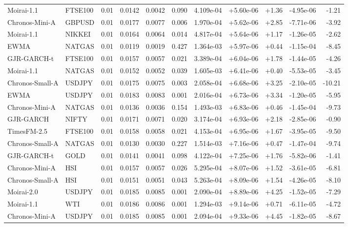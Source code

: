 \begin{tabular}{llrrrrrrrrr}
Moirai-1.1 & FTSE100 & 0.01 & 0.0142 & 0.0042 & 0.090 & 4.109e-04 & +5.60e-06 & +1.36 & -4.95e-06 & -1.21 \\
Chronos-Mini-A & GBPUSD & 0.01 & 0.0177 & 0.0077 & 0.006 & 1.970e-04 & +5.62e-06 & +2.85 & -7.71e-06 & -3.92 \\
Moirai-1.1 & NIKKEI & 0.01 & 0.0164 & 0.0064 & 0.014 & 4.817e-04 & +5.64e-06 & +1.17 & -1.26e-05 & -2.62 \\
EWMA & NATGAS & 0.01 & 0.0119 & 0.0019 & 0.427 & 1.364e-03 & +5.97e-06 & +0.44 & -1.15e-04 & -8.45 \\
GJR-GARCH-t & FTSE100 & 0.01 & 0.0157 & 0.0057 & 0.021 & 3.389e-04 & +6.04e-06 & +1.78 & -1.44e-05 & -4.26 \\
Moirai-1.1 & NATGAS & 0.01 & 0.0152 & 0.0052 & 0.039 & 1.605e-03 & +6.41e-06 & +0.40 & -5.53e-05 & -3.45 \\
Chronos-Small-A & USDJPY & 0.01 & 0.0175 & 0.0075 & 0.003 & 2.058e-04 & +6.68e-06 & +3.25 & -2.10e-05 & -10.21 \\
EWMA & USDJPY & 0.01 & 0.0183 & 0.0083 & 0.001 & 2.016e-04 & +6.73e-06 & +3.34 & -1.20e-05 & -5.95 \\
Chronos-Mini-A & NATGAS & 0.01 & 0.0136 & 0.0036 & 0.154 & 1.493e-03 & +6.83e-06 & +0.46 & -1.45e-04 & -9.73 \\
GJR-GARCH & NIFTY & 0.01 & 0.0171 & 0.0071 & 0.020 & 3.174e-04 & +6.93e-06 & +2.18 & -2.85e-06 & -0.90 \\
TimesFM-2.5 & FTSE100 & 0.01 & 0.0158 & 0.0058 & 0.021 & 4.153e-04 & +6.95e-06 & +1.67 & -3.95e-05 & -9.50 \\
Chronos-Small-A & NATGAS & 0.01 & 0.0130 & 0.0030 & 0.227 & 1.514e-03 & +7.16e-06 & +0.47 & -1.47e-04 & -9.74 \\
GJR-GARCH-t & GOLD & 0.01 & 0.0141 & 0.0041 & 0.098 & 4.122e-04 & +7.25e-06 & +1.76 & -5.82e-06 & -1.41 \\
Chronos-Mini-A & HSI & 0.01 & 0.0157 & 0.0057 & 0.026 & 5.295e-04 & +8.07e-06 & +1.52 & -3.61e-05 & -6.81 \\
Chronos-Small-A & HSI & 0.01 & 0.0151 & 0.0051 & 0.043 & 5.263e-04 & +8.09e-06 & +1.54 & -4.26e-05 & -8.10 \\
Moirai-2.0 & USDJPY & 0.01 & 0.0185 & 0.0085 & 0.001 & 2.090e-04 & +8.89e-06 & +4.25 & -1.52e-05 & -7.29 \\
Moirai-1.1 & WTI & 0.01 & 0.0186 & 0.0086 & 0.001 & 1.294e-03 & +9.14e-06 & +0.71 & -6.11e-05 & -4.72 \\
Chronos-Mini-A & USDJPY & 0.01 & 0.0185 & 0.0085 & 0.001 & 2.094e-04 & +9.33e-06 & +4.45 & -1.82e-05 & -8.67 \\

\end{tabular}
